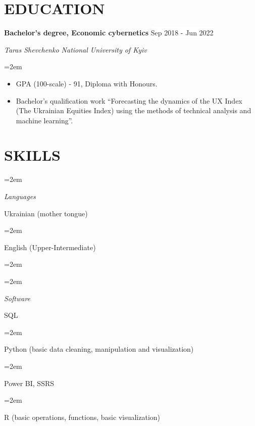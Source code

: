 \documentclass[paper=a4,fontsize=11pt]{scrartcl} %
\newlength{\spacebox}
\newcommand{\NewPart}[1]{\section*{\uppercase{#1}}}
\newcommand{\PersonalEntry}[2]{
		\noindent\hangindent=2em\hangafter=0 %
		\parbox{\spacebox}{        %
		\textit{#1}}		       %
		\hspace{1.5em} #2 \par}    %
\newcommand{\SkillsEntry}[2]{      %
		\noindent\hangindent=2em\hangafter=0 %
		\parbox{\spacebox}{        %
		\textit{#1}}			   %
		\hspace{1.5em} #2 \par}    %
\newcommand{\EducationEntry}[4]{
		\noindent \textbf{#1} \hfill      %
        \colorbox{White}{\color{Black}#2} \par  %
		\noindent \textit{#3} \par        %
		\noindent\hangindent=2em\hangafter=0 \small #4 %
		\normalsize \par}
\begin{document}
\NewPart{Education}{}

\EducationEntry{Bachelor's degree, Economic cybernetics}{Sep 2018 - Jun 2022}{Taras Shevchenko National University of Kyiv}{\begin{itemize} \setlength{\itemsep}{0pt} \item[\textcolor{white}{\textbullet}]  GPA (100-scale) - 91, Diploma with Honours. \item[\textcolor{white}{\textbullet}] Bachelor's qualification work “Forecasting the dynamics of the UX Index (The Ukrainian Equities Index) using the methods of technical analysis and machine learning”.\end{itemize}}


\NewPart{Skills}{}

\SkillsEntry{Languages}{Ukrainian (mother tongue)}
\SkillsEntry{}{English (Upper-Intermediate)}
\SkillsEntry{}{}
\SkillsEntry{Software}{SQL}
\SkillsEntry{}{Python (basic data cleaning, manipulation and visualization)}
\SkillsEntry{}{Power BI, SSRS}
\SkillsEntry{}{R (basic operations, functions, basic visualization)}
\end{document}
